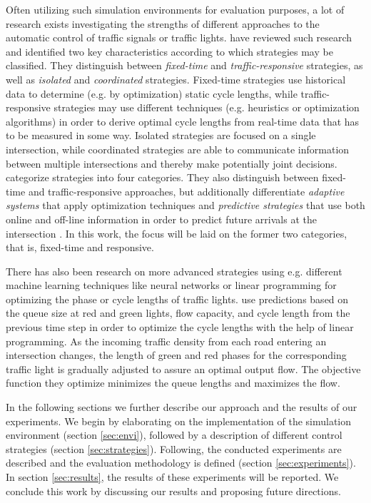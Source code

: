 \documentclass[11pt]{article}
\begin{document}
Often utilizing such simulation environments for evaluation purposes, a lot of research exists investigating the strengths of different approaches to the automatic control of traffic signals or traffic lights. \citet{papageorgiou2003review} have reviewed such research and identified two key characteristics according to which strategies may be classified. They distinguish between \textit{fixed-time} and \textit{traffic-responsive} strategies, as well as \textit{isolated} and \textit{coordinated} strategies. Fixed-time strategies use historical data to determine (e.g. by optimization) static cycle lengths, while traffic-responsive strategies may use different techniques (e.g. heuristics or optimization algorithms) in order to derive optimal cycle lengths from real-time data that has to be measured in some way. Isolated strategies are focused on a single intersection, while coordinated strategies are able to communicate information between multiple intersections and thereby make potentially joint decisions. \citet{coll2013linear} categorize strategies into four categories. They also distinguish between fixed-time and traffic-responsive approaches, but additionally differentiate \textit{adaptive systems} that apply optimization techniques and \textit{predictive strategies} that use both online and off-line information in order to predict future arrivals at the intersection \citep{coll2013linear}. In this work, the focus will be laid on the former two categories, that is, fixed-time and responsive.

There has also been research on more advanced strategies using e.g. different machine learning techniques like neural networks \citep[e.g.][]{srinivasan2006neural, chao2008intelligent} or linear programming \citep[e.g.][]{coll2013linear, lin2004enhanced} for optimizing the phase or cycle lengths of traffic lights. \citet[][]{coll2013linear} use predictions based on the queue size at red and green lights, flow capacity, and cycle length from the previous time step in order to optimize the cycle lengths with the help of linear programming. As the incoming traffic density from each road entering an intersection changes, the length of green and red phases for the corresponding traffic light is gradually adjusted to assure an optimal output flow. The objective function they optimize minimizes the queue lengths and maximizes the flow. 

\vspace{20pt}

In the following sections we further describe our approach and the results of our experiments. We begin by elaborating on the implementation of the simulation environment (section \ref{sec:envi}), followed by a description of different control strategies (section \ref{sec:strategies}). Following, the conducted experiments are described and the evaluation methodology is defined (section \ref{sec:experiments}). In section \ref{sec:results}, the results of these experiments will be reported. We conclude this work by discussing our results and proposing future directions.
	
\end{document}
